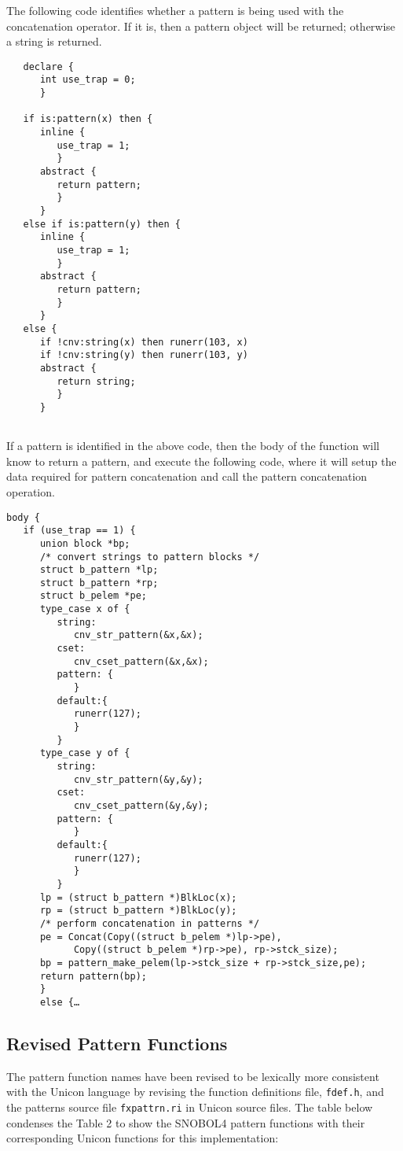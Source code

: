 \documentclass{article}
\begin{document}
The following code identifies whether a pattern is being used with the concatenation operator.  If it is, then a pattern object will be returned; otherwise a string is returned.
\begin{verbatim}
   declare {
      int use_trap = 0;
      }

   if is:pattern(x) then {
      inline {
         use_trap = 1;
         }
      abstract {
         return pattern;
         }
      }
   else if is:pattern(y) then {
      inline {
         use_trap = 1;
         }
      abstract {
         return pattern;
         }
      }
   else {
      if !cnv:string(x) then runerr(103, x)
      if !cnv:string(y) then runerr(103, y)
      abstract {
         return string;
         }
      }
      
\end{verbatim}
If a pattern is identified in the above code, then the body of the function will know to return a pattern, and execute the following code, where it will setup the data required for pattern concatenation and call the pattern concatenation operation.
\begin{verbatim}
body {
   if (use_trap == 1) {
      union block *bp;
      /* convert strings to pattern blocks */
      struct b_pattern *lp;
      struct b_pattern *rp;
      struct b_pelem *pe;
      type_case x of {
         string:
            cnv_str_pattern(&x,&x);
         cset:
            cnv_cset_pattern(&x,&x);
         pattern: {
            }
         default:{
            runerr(127);
            }
         }
      type_case y of {
         string:
            cnv_str_pattern(&y,&y);
         cset:
			cnv_cset_pattern(&y,&y);
         pattern: {
            }
         default:{
            runerr(127);
            }
         }
      lp = (struct b_pattern *)BlkLoc(x);
      rp = (struct b_pattern *)BlkLoc(y);
      /* perform concatenation in patterns */
      pe = Concat(Copy((struct b_pelem *)lp->pe), 
            Copy((struct b_pelem *)rp->pe), rp->stck_size);
      bp = pattern_make_pelem(lp->stck_size + rp->stck_size,pe);
      return pattern(bp);
      }
      else {…
\end{verbatim}

\subsection{Revised Pattern Functions}
The pattern function names have been revised to be lexically more consistent with the Unicon language by revising the function definitions file, \texttt{fdef.h}, and the patterns source file \texttt{fxpattrn.ri} in Unicon source files.  The table below condenses the Table 2 to show the SNOBOL4 pattern functions with their corresponding Unicon functions for this implementation:  
\end{document}
